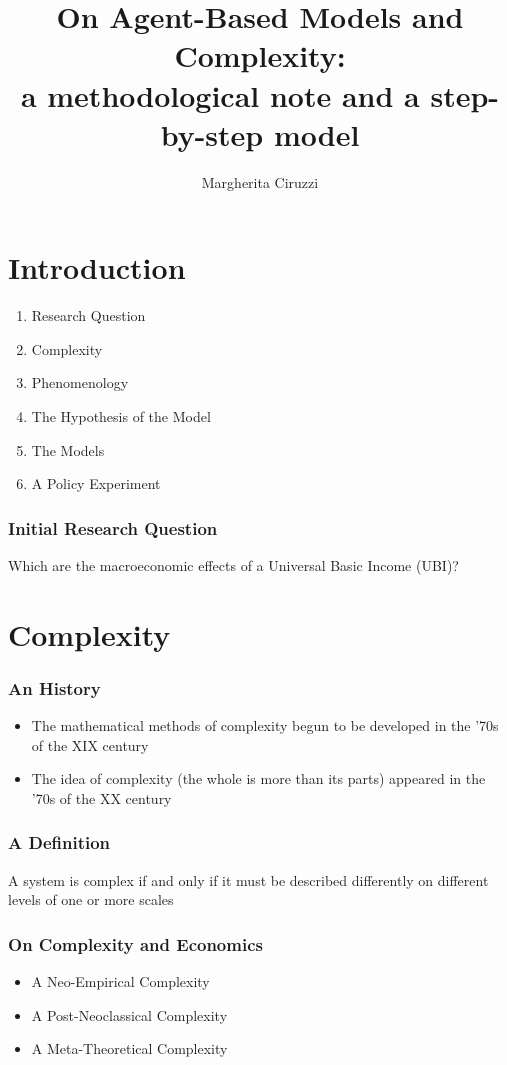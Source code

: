 \documentclass[]{beamer}
\title[On Agent-Based Models and Complexity]{
	On Agent-Based Models and Complexity:\\ a methodological note and a step-by-step model
}
\author[Ciruzzi, M.]{Margherita Ciruzzi}
\institute[UnInsubria]{Università degli Studi dell'Insubria}
\date{}
\begin{document}
\frame{\titlepage}

\section*{Introduction}
\begin{frame}
    \begin{enumerate}
    	\item Research Question
    	\item Complexity
    	\item Phenomenology
    	\item The Hypothesis of the Model
    	\item The Models
    	\item A Policy Experiment
    \end{enumerate}
\end{frame}

\begin{frame}
	\frametitle{Initial Research Question}
	\centering
	Which are the macroeconomic effects of a Universal Basic Income (UBI)?
\end{frame}

\section*{Complexity}
\begin{frame}
	\frametitle{An History}
	\begin{itemize}
		\item The mathematical methods of complexity begun to be developed in the '70s of the XIX century
		\item The idea of complexity (the whole is more than its parts) appeared in the '70s of the XX century
	\end{itemize}
\end{frame}

\begin{frame}
	\frametitle{A Definition}
	\centering
	A system is complex if and only if it must be described differently on different levels of one or more scales
\end{frame}

\begin{frame}
	\frametitle{On Complexity and Economics}
	\begin{itemize}
		\item A Neo-Empirical Complexity
		\item A Post-Neoclassical Complexity
		\item A Meta-Theoretical Complexity
	\end{itemize}
\end{frame}
\end{document}
